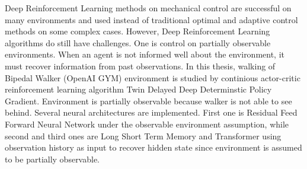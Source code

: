 Deep Reinforcement Learning methods on mechanical control are successful on many environments and used instead of traditional optimal and adaptive control methods on some complex cases. However, Deep Reinforcement Learning algorithms do still have challenges. One is control on partially observable environments. When an agent is not informed well about the environment, it must recover information from past observations. In this thesis, walking of Bipedal Walker (OpenAI GYM) environment is studied by continious actor-critic reinforcement learning algorithm Twin Delayed Deep Determinstic Policy Gradient. Environment is partially observable because walker is not able to see behind. Several neural architectures are implemented. First one is Residual Feed Forward Neural Network under the observable environment assumption, while second and third ones are Long Short Term Memory and Transformer using observation history as input to recover hidden state since environment is assumed to be partially observable.



